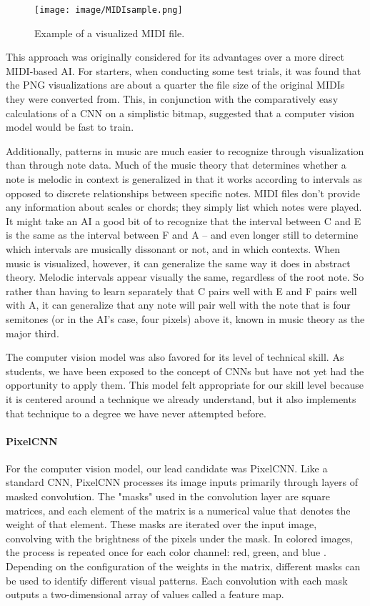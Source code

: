 \begin{figure}[h!]
  \centering
  \texttt{[image: image/MIDIsample.png]}
  \caption{Example of a visualized MIDI file.}
  \label{fig:midi_sample}
\end{figure}

This approach was originally considered for its advantages over a more direct MIDI-based
AI. For starters, when conducting some test trials, it was found that the PNG
visualizations are about a quarter the file size of the original MIDIs they were converted
from. This, in conjunction with the comparatively easy calculations of a CNN on a
simplistic bitmap, suggested that a computer vision model would be fast to train.

Additionally, patterns in music are much easier to recognize through visualization than
through note data. Much of the music theory that determines whether a note is melodic in
context is generalized in that it works according to intervals as opposed to discrete
relationships between specific notes. MIDI files don't provide any information about
scales or chords; they simply list which notes were played. It might take an AI a good bit
of to recognize that the interval between C and E is the same as the interval between F
and A -- and even longer still to determine which intervals are musically dissonant or not,
and in which contexts. When music is visualized, however, it can generalize the same way
it does in abstract theory. Melodic intervals appear visually the same, regardless of the
root note. So rather than having to learn separately that C pairs well with E and F pairs
well with A, it can generalize that any note will pair well with the note that is four
semitones (or in the AI's case, four pixels) above it, known in music theory as the major
third.

The computer vision model was also favored for its level of technical skill. As students,
we have been exposed to the concept of CNNs but have not yet had the opportunity to apply
them. This model felt appropriate for our skill level because it is centered around a
technique we already understand, but it also implements that technique to a degree we have
never attempted before.

\paragraph{PixelCNN}

For the computer vision model, our lead candidate was PixelCNN. Like a standard CNN,
PixelCNN processes its image inputs primarily through layers of masked convolution.
The "masks" used in the convolution layer are square matrices, and each element of the matrix
is a numerical value that denotes the weight of that element. These masks are iterated over the
input image, convolving with the brightness of the pixels under the mask. In colored images,
the process is repeated once for each color channel: red, green, and blue \autocite{pixelCNN}. Depending on the
configuration of the weights in the matrix, different masks can be used to identify different
visual patterns. Each convolution with each mask outputs a two-dimensional array of values
called a feature map.

